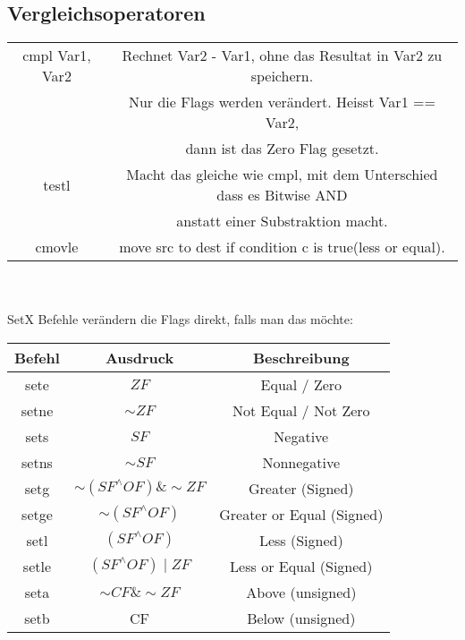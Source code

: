 \documentclass[a4paper, 11pt]{article}
\begin{document}
\subsection{Vergleichsoperatoren}
\begin{tabular}{|c|c|}
	\hline
	cmpl Var1, Var2 & Rechnet Var2 - Var1, ohne das Resultat in Var2 zu speichern.\\ 
	& Nur die Flags werden verändert. Heisst Var1 == Var2, \\
	& dann ist das Zero Flag gesetzt.\\\hline
	testl & Macht das gleiche wie cmpl, mit dem Unterschied dass es Bitwise AND\\
	& anstatt einer Substraktion macht.\\\hline
	{\color{red}cmovle} & move src to dest if condition c is true(less or equal).\\\hline
\end{tabular}\\ \\
SetX Befehle verändern die Flags direkt, falls man das möchte:\\
\begin{tabular}{|c|c|c|}
	\hline
	Befehl & Ausdruck & Beschreibung\\\hline 
	sete & $ZF$ & Equal / Zero\\\hline 
	setne & $\sim ZF$ & Not Equal / Not Zero\\\hline 
	sets & $SF$ & Negative\\\hline 
	setns & $\sim SF$ & Nonnegative\\\hline  
	setg & $\sim(SF^\wedge OF)\&\sim ZF$ & Greater (Signed)\\\hline 
	setge & $\sim(SF^\wedge OF)$ & Greater or Equal (Signed)\\\hline 
	setl & $(SF^\wedge OF)$ & Less (Signed)\\\hline 
	setle & $(SF^\wedge OF)\mid ZF$ & Less or Equal (Signed)\\\hline 
	seta & $\sim CF\&\sim ZF$ & Above (unsigned)\\\hline 
	setb & CF & Below (unsigned)\\\hline
\end{tabular}
\end{document}
